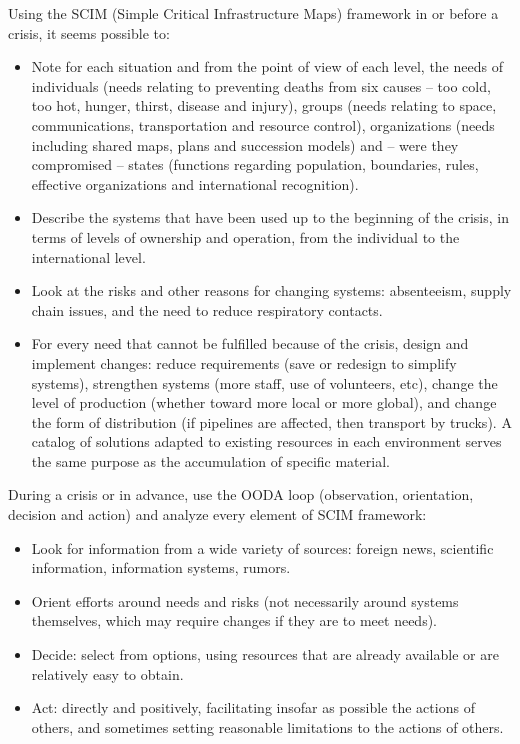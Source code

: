 \documentclass[12pt, a4]{scrartcl}
\begin{document}
Using the SCIM (Simple Critical Infrastructure Maps) framework in or before a crisis, it seems possible to:
\begin{itemize}
	\item Note for each situation and from the point of view of each level, the needs of individuals (needs relating to preventing deaths from six causes – too cold, too hot, hunger, thirst, disease and injury), groups (needs relating to space, communications, transportation and resource control), organizations (needs including shared maps, plans and succession models) and – were they compromised – states (functions regarding population, boundaries, rules, effective organizations and international recognition).
	\item Describe the systems that have been used up to the beginning of the crisis, in terms of levels of ownership and operation, from the individual to the international level.
	\item Look at the risks and other reasons for changing systems: absenteeism, supply chain issues, and the need to reduce respiratory contacts.
	\item For every need that cannot be fulfilled because of the crisis, design and implement changes: reduce requirements (save or redesign to simplify systems), strengthen systems (more staff, use of volunteers, etc), change the level of production (whether toward more local or more global), and change the form of distribution (if pipelines are affected, then transport by trucks). A catalog of solutions adapted to existing resources in each environment serves the same purpose as the accumulation of specific material.
\end{itemize}

During a crisis or in advance, use the OODA loop (observation, orientation, decision and action) and analyze every element of SCIM framework:
\begin{itemize}
	\item Look for information from a wide variety of sources: foreign news, scientific information, information systems, rumors.
	\item Orient efforts around needs and risks (not necessarily around systems themselves, which may require changes if they are to meet needs).
	\item Decide: select from options, using resources that are already available or are relatively easy to obtain.
	\item Act: directly and positively, facilitating insofar as possible the actions of others, and sometimes setting reasonable limitations to the actions of others.
\end{itemize}
\end{document}
